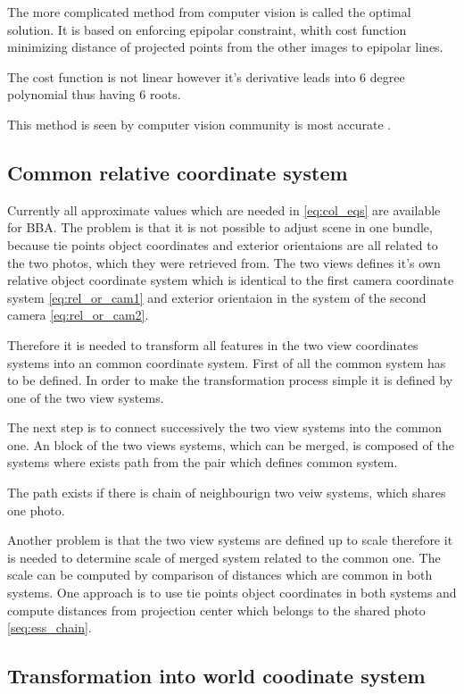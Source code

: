 \documentclass[a4paper,12pt]{report}
\begin{document}
\begin{itemize}
The more complicated method from computer vision is called the optimal solution. 
It is based on enforcing epipolar constraint, whith cost function 
minimizing distance of projected points from the other images to epipolar lines.

The cost function is not linear however it's derivative leads into 6 degree polynomial thus 
having 6 roots.

This method is seen by computer vision community is most accurate \cite[p. 315]{Hartley2004}.  


\subsection{Common relative coordinate system}

Currently all approximate values which are needed in \eqref{eq:col_eqs} are available for BBA. 
The problem is that it is not possible to adjust scene in one bundle, because tie points
object coordinates and exterior orientaions are all related to the two photos, which they were 
retrieved from. The two views defines it's own relative object coordinate system which is identical
to the first camera coordinate system \eqref{eq:rel_or_cam1} and
exterior orientaion in the system of the second camera \eqref{eq:rel_or_cam2}.


Therefore it is needed to transform all features in the two view coordinates systems into 
an common coordinate system. First of all the common system has to be defined.
In order to make the transformation process simple it is defined by one of the two view
systems.

The next step is to connect successively the two view systems into the common one.  
An block of the two views systems, which can be merged, is composed of the systems 
where exists path from the pair which defines common system.

The path exists if there is chain of neighbourign two veiw systems, which 
shares one photo. 

Another problem is that the two view systems are defined up to scale therefore 
it is needed to determine scale of merged system related to the common one. 
The scale can be computed by comparison of distances which are common in both systems.
One approach is to use tie points object coordinates in both systems 
and compute distances from projection center which belongs to the shared photo \ref{seq:ess_chain}. 


\subsection{Transformation into world coodinate system}


\end{itemize}
\end{document}
